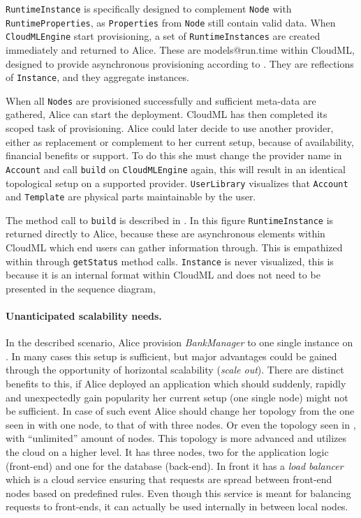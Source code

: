 \texttt{RuntimeInstance} is specifically designed to complement \texttt{Node} with \texttt{RuntimeProperties},
as \texttt{Properties} from \texttt{Node} still contain valid data.
When \texttt{CloudMLEngine} start provisioning, a set of \texttt{RuntimeInstances} are created immediately 
and returned to Alice.
These are models@run.time within CloudML, designed to provide asynchronous provisioning
according to .
They are reflections of \texttt{Instance}, and they aggregate instances.

When all \texttt{Nodes} are provisioned successfully and sufficient meta-data are gathered,
Alice can start the deployment.
CloudML has then completed its scoped task of provisioning.
Alice could later decide to use another provider, either as replacement or complement to her current setup,
because of availability, financial benefits or support.
To do this she must change the provider name in \texttt{Account} and call \texttt{build} on \texttt{CloudMLEngine} again,
this will result in an identical topological setup on a supported provider.
\texttt{UserLibrary} visualizes that \texttt{Account} and \texttt{Template} are 
physical parts maintainable by the user.

The method call to \texttt{build} is described in .
In this figure \texttt{RuntimeInstance} is returned directly to Alice,
because these are asynchronous elements within CloudML which end users can gather 
information through.
This is empathized within  through \texttt{getStatus} method calls.
\texttt{Instance} is never visualized, this is because it is an internal format
within CloudML and does not need to be presented in the sequence diagram,

\paragraph{Unanticipated scalability needs.}

In the described scenario, Alice provision \emph{BankManager} to one single instance on .
In many cases this setup is sufficient, but major advantages
could be gained through the opportunity of horizontal scalability (\emph{scale out}).
There are distinct benefits to this, 
\eg if Alice deployed an application which should suddenly, 
rapidly and unexpectedly gain popularity her current setup (one single node) might not be sufficient.
In case of such event Alice should change her topology from the one seen in 
 with one node, to that of  with three nodes.
Or even the topology seen in , with ``unlimited'' amount of nodes.
This topology is more advanced and utilizes the cloud on a higher level.
It has three nodes, two for the application logic (front-end) and one for the database (back-end).
In front it has a \emph{load balancer} which is a cloud service ensuring that requests
are spread between front-end nodes based on predefined rules.
Even though this service is meant for balancing requests to front-ends,
it can actually be used internally in between local nodes.

